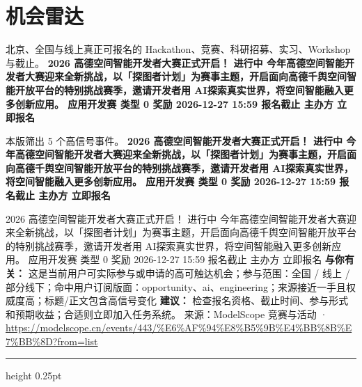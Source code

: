 \documentclass[10.5pt]{ctexart}
\begin{document}
\section*{机会雷达}
{\color{ormuted} 北京、全国与线上真正可报名的 Hackathon、竞赛、科研招募、实习、Workshop 与截止。}
\vspace{2mm}
{\LARGE\bfseries 2026 高德空间智能开发者大赛正式开启！ 进行中 今年高德空间智能开发者大赛迎来全新挑战，以「探图者计划」为赛事主题，开启面向高德千舆空间智能开放平台的特别挑战赛季，邀请开发者用 AI探索真实世界，将空间智能融入更多创新应用。 应用开发赛 类型 0 奖励 2026-12-27 15:59 报名截止 主办方 立即报名}\par
\vspace{1mm}
{\color{ormuted} 本版筛出 5 个高信号事件。}
\vspace{3mm}
{\Large\bfseries 2026 高德空间智能开发者大赛正式开启！ 进行中 今年高德空间智能开发者大赛迎来全新挑战，以「探图者计划」为赛事主题，开启面向高德千舆空间智能开放平台的特别挑战赛季，邀请开发者用 AI探索真实世界，将空间智能融入更多创新应用。 应用开发赛 类型 0 奖励 2026-12-27 15:59 报名截止 主办方 立即报名}\par
2026 高德空间智能开发者大赛正式开启！ 进行中 今年高德空间智能开发者大赛迎来全新挑战，以「探图者计划」为赛事主题，开启面向高德千舆空间智能开放平台的特别挑战赛季，邀请开发者用 AI探索真实世界，将空间智能融入更多创新应用。 应用开发赛 类型 0 奖励 2026-12-27 15:59 报名截止 主办方 立即报名
\textbf{与你有关：} 这是当前用户可实际参与或申请的高可触达机会；参与范围：全国 / 线上 / 部分线下；命中用户订阅版面：opportunity、ai、engineering；来源接近一手且权威度高；标题/正文包含高信号变化
\textbf{建议：} 检查报名资格、截止时间、参与形式和预期收益；合适则立即加入任务系统。
{\footnotesize\color{ormuted} 来源：ModelScope 竞赛与活动 · \url{https://modelscope.cn/events/443/%E6%AF%94%E8%B5%9B%E4%BB%8B%E7%BB%8D?from=list}}
\vspace{4mm}
\hrule height 0.25pt
\vspace{3mm}
\end{document}
